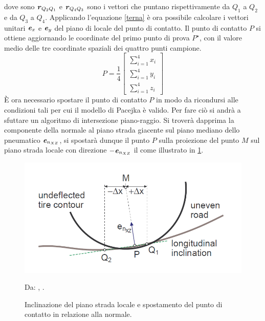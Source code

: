 %
dove sono $\textbf{\textit{r}}_{Q_2 Q_1}$ e $\textbf{\textit{r}}_{Q_4 Q_3}$ sono i vettori che puntano rispettivamente da $Q_1$ a $Q_2$ e da $Q_3$ a $Q_4$. Applicando l'equazione \ref{terna} è ora possibile calcolare i vettori unitari $\textbf{\textit{e}}_{x}$ e $\textbf{\textit{e}}_{y}$ del piano di locale del punto di contatto. Il punto di contatto $P$ si ottiene aggiornando le coordinate del primo punto di prova $P^\star$, con il valore medio delle tre coordinate spaziali dei quattro punti campione.
%
\begin{equation}
P = \frac{1}{4}\begin{bmatrix}
\sum_{i=1}^{4} x_i \\
\sum_{i=1}^{4} y_i \\
\sum_{i=1}^{4} z_i
\end{bmatrix}
\end{equation}
%
È ora necessario spostare il punto di contatto $P$ in modo da ricondursi alle condizioni tali per cui il modello di Pacejka è valido. Per fare ciò si andrà a sfuttare un algoritmo di intersezione piano-raggio. Si troverà dapprima la componente della normale al piano strada giacente sul piano mediano dello pneumatico $\textbf{\textit{e}}_{n_{XZ}}$, si spostarà dunque il punto $P$ sulla proiezione del punto $M$ sul piano strada locale con direzione $-\textbf{\textit{e}}_{n_{XZ}}$ il come illustrato in \figurename{  \ref{localplane}}.

\begin{figure}[h]
	\centering
	\includegraphics[width=0.5\linewidth]{Figures/local_plane}
	\caption{Inclinazione del piano strada locale e spostamento del punto di contatto in relazione alla normale.}
	Da: \citeauthor{Rill}, .
	\label{localplane}
\end{figure}

